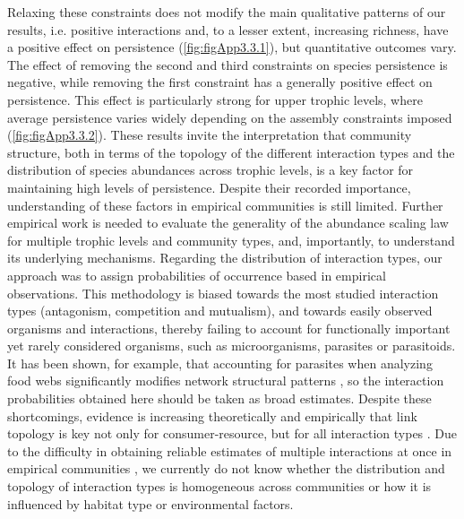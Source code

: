 Relaxing these constraints does not modify the main qualitative patterns of our results, i.e. positive interactions and, to a lesser extent, increasing richness, have a positive effect on persistence (\cref{fig:figApp3.3.1}), but quantitative outcomes vary. The effect of removing the second and third constraints on species persistence is negative, while removing the first constraint has a generally positive effect on persistence. This effect is particularly strong for upper trophic levels, where average persistence varies widely depending on the assembly constraints imposed (\cref{fig:figApp3.3.2}). These results invite the interpretation that community structure, both in terms of the topology of the different interaction types and the distribution of species abundances across trophic levels, is a key factor for maintaining high levels of persistence. Despite their recorded importance, understanding of these factors in empirical communities is still limited. Further empirical work is needed to evaluate the generality of the abundance scaling law \citep{Hatton2015} for multiple trophic levels and community types, and, importantly, to understand its underlying mechanisms. Regarding the distribution of interaction types, our approach was to assign probabilities of occurrence based in empirical observations. This methodology is biased towards the most studied interaction types (antagonism, competition and mutualism), and towards easily observed organisms and interactions, thereby failing to account for functionally important yet rarely considered organisms, such as microorganisms, parasites or parasitoids. It has been shown, for example, that accounting for parasites when analyzing food webs significantly modifies network structural patterns \citep{Lafferty2006}, so the interaction probabilities obtained here should be taken as broad estimates. Despite these shortcomings, evidence is increasing theoretically and empirically that link topology is key not only for consumer-resource, but for all interaction types \citep{Pocock2012,Evans2013a,Kefi2015,Kefi2016a,Sauve2016}. Due to the difficulty in obtaining reliable estimates of multiple interactions at once in empirical communities \citep{Garcia-Callejas2018}, we currently do not know whether the distribution and topology of interaction types is homogeneous across communities or how it is influenced by habitat type or environmental factors.

